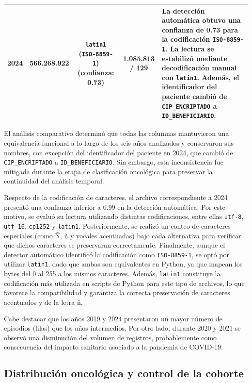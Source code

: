 \begin{table}[htbp]
\begin{tabular}{|c|c|c|c|l|}
\parbox[t]{1cm}{2024} &
\parbox[t]{2.3cm}{566.268.922} &
\parbox[t]{2.0cm}{\texttt{latin1} (\texttt{ISO-8859-1}) (confianza: 0.73)} &
\parbox[t]{2.5cm}{1.085.813 / 129} &
\parbox[t]{5.2cm}{La detección automática obtuvo una confianza de 0.73 para la codificación \texttt{ISO-8859-1}. La lectura se estabilizó mediante decodificación manual con \texttt{latin1}. Además, el identificador del paciente cambió de \texttt{CIP\_ENCRIPTADO} a \texttt{ID\_BENEFICIARIO}.} \\ \hline

\end{tabular}
\end{table}

El análisis comparativo determinó que todas las columnas mantuvieron una equivalencia funcional a lo largo de los seis años analizados y conservaron sus nombres, con excepción del identificador del paciente en 2024, que cambió de \texttt{CIP\_ENCRIPTADO} a \texttt{ID\_BENEFICIARIO}. Sin embargo, esta inconsistencia fue mitigada durante la etapa de clasificación oncológica para preservar la continuidad del análisis temporal.

Respecto de la codificación de caracteres, el archivo correspondiente a 2024 presentó una confianza inferior a 0.99 en la detección automática. Por este motivo, se evaluó su lectura utilizando distintas codificaciones, entre ellas \texttt{utf-8}, \texttt{utf-16}, \texttt{cp1252} y \texttt{latin1}. Posteriormente, se realizó un conteo de caracteres especiales (como Ñ, ñ y vocales acentuadas) bajo cada alternativa para verificar que dichos caracteres se preservaran correctamente. Finalmente, aunque el detector automático identificó la codificación como \texttt{ISO-8859-1}, se optó por utilizar \texttt{latin1}, dado que ambas son equivalentes en Python, ya que mapean los bytes del 0 al 255 a los mismos caracteres. Además, \texttt{latin1} constituye la codificación más utilizada en scripts de Python para este tipo de archivos, lo que favorece la compatibilidad y garantiza la correcta preservación de caracteres acentuados y de la letra ñ.

Cabe destacar que los años 2019 y 2024 presentaron un mayor número de episodios (filas) que los años intermedios. Por otro lado, durante 2020 y 2021 se observó una disminución del volumen de registros, probablemente como consecuencia del impacto sanitario asociado a la pandemia de COVID-19.

\subsection{Distribución oncológica y control de la cohorte}

